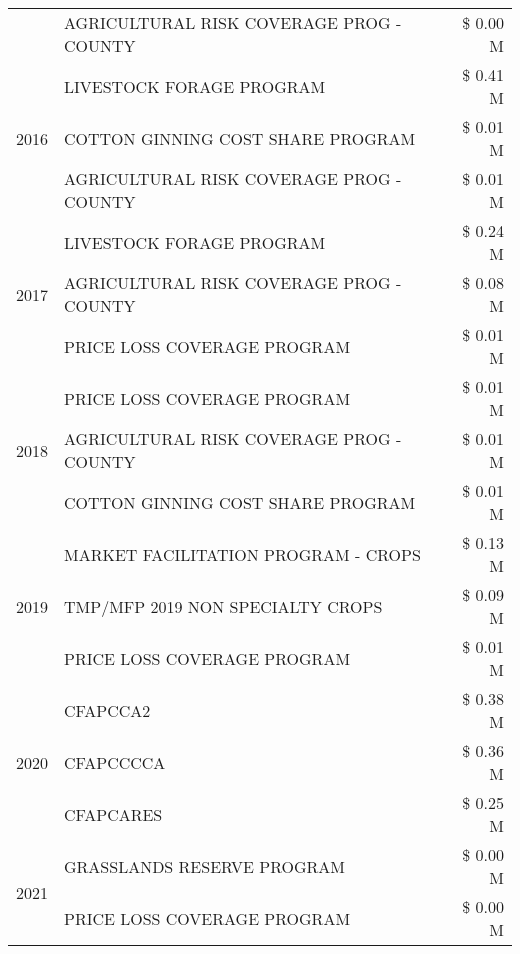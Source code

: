 \begin{tabular}{llr}
 & AGRICULTURAL RISK COVERAGE PROG - COUNTY & \$ 0.00 M \\
\cline{1-3}
\multirow[t]{3}{*}{2016} & LIVESTOCK FORAGE PROGRAM                      & \$ 0.41 M \\
 & COTTON GINNING COST SHARE PROGRAM             & \$ 0.01 M \\
 & AGRICULTURAL RISK COVERAGE PROG - COUNTY      & \$ 0.01 M \\
\cline{1-3}
\multirow[t]{3}{*}{2017} & LIVESTOCK FORAGE PROGRAM & \$ 0.24 M \\
 & AGRICULTURAL RISK COVERAGE PROG - COUNTY & \$ 0.08 M \\
 & PRICE LOSS COVERAGE PROGRAM & \$ 0.01 M \\
\cline{1-3}
\multirow[t]{3}{*}{2018} & PRICE LOSS COVERAGE PROGRAM & \$ 0.01 M \\
 & AGRICULTURAL RISK COVERAGE PROG - COUNTY & \$ 0.01 M \\
 & COTTON GINNING COST SHARE PROGRAM & \$ 0.01 M \\
\cline{1-3}
\multirow[t]{3}{*}{2019} & MARKET FACILITATION PROGRAM - CROPS & \$ 0.13 M \\
 & TMP/MFP 2019 NON SPECIALTY CROPS & \$ 0.09 M \\
 & PRICE LOSS COVERAGE PROGRAM & \$ 0.01 M \\
\cline{1-3}
\multirow[t]{3}{*}{2020} & CFAPCCA2 & \$ 0.38 M \\
 & CFAPCCCCA & \$ 0.36 M \\
 & CFAPCARES & \$ 0.25 M \\
\cline{1-3}
\multirow[t]{2}{*}{2021} & GRASSLANDS RESERVE PROGRAM & \$ 0.00 M \\
 & PRICE LOSS COVERAGE PROGRAM & \$ 0.00 M \\
\cline{1-3}
\bottomrule
\end{tabular}
